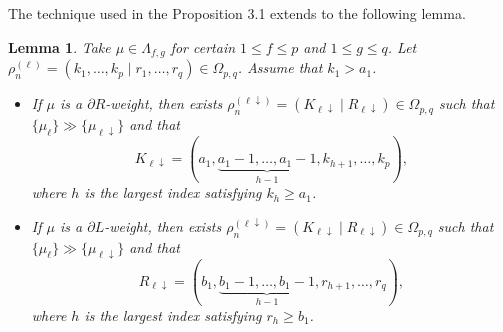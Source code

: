 \documentclass[11pt]{amsart}
\theoremstyle{plain}
\newtheorem{lemma}[thm]{Lemma}
\theoremstyle{definition}
\begin{document}
The technique used in the Proposition 3.1 extends to the following lemma.
\begin{lemma}\label{lemma-down}
Take $\mu\in \Lambda_{f, g}$ for certain $1\leq f\leq p$ and $1\leq g\leq q$.
Let $\rho_n^{(\ell)}=(k_1,\dots,k_p\mid r_1,\dots,r_q)\in\Omega_{p,q}$. Assume that $k_1>a_1$.
	\begin{itemize}
		\item[(a)] If $\mu$ is a $\partial R$-weight, then exists  $\rho_n^{(\ell\downarrow)}=(K_{\ell\downarrow}\mid R_{\ell\downarrow})\in\Omega_{p, q}$ such that $\{\mu_\ell\}\gg\{\mu_{\ell\downarrow}\}$ and that
		\[K_{\ell\downarrow}=(a_1, \underbrace{a_1-1, \dots, a_1-1}_{h-1}, k_{h+1}, \dots, k_p),\]
		where $h$ is the largest index satisfying $k_h\ge a_1$.
		\item[(b)] If $\mu$ is a $\partial L$-weight, then exists $\rho_n^{(\ell\downarrow)}=(K_{\ell\downarrow}\mid R_{\ell\downarrow})\in\Omega_{p, q}$ such that $\{\mu_\ell\}\gg\{\mu_{\ell\downarrow}\}$ and that
		\[R_{\ell\downarrow}=(b_1, \underbrace{b_1-1, \dots, b_1-1}_{h-1}, r_{h+1}, \dots, r_q),\]
		where $h$ is the largest index satisfying $r_h\ge b_1$.
	\end{itemize}
\end{lemma}
\end{document}
